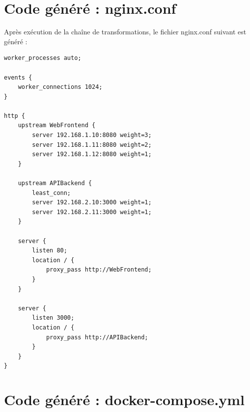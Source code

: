 \documentclass[12pt,a4paper]{report}
\begin{document}
\section{Code généré : nginx.conf}

Après exécution de la chaîne de transformations, le fichier nginx.conf suivant est généré :

\begin{lstlisting}[language={}, caption={Fichier nginx.conf généré}]
worker_processes auto;

events {
    worker_connections 1024;
}

http {
    upstream WebFrontend {
        server 192.168.1.10:8080 weight=3;
        server 192.168.1.11:8080 weight=2;
        server 192.168.1.12:8080 weight=1;
    }

    upstream APIBackend {
        least_conn;
        server 192.168.2.10:3000 weight=1;
        server 192.168.2.11:3000 weight=1;
    }

    server {
        listen 80;
        location / {
            proxy_pass http://WebFrontend;
        }
    }

    server {
        listen 3000;
        location / {
            proxy_pass http://APIBackend;
        }
    }
}
\end{lstlisting}

\section{Code généré : docker-compose.yml}
\end{document}
